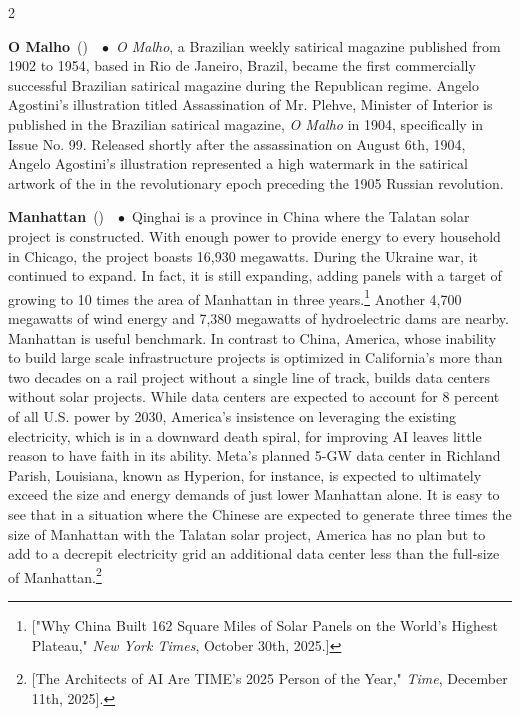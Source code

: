 \documentclass[10pt,a4paper,twoside]{article} %
\newcommand{\entry}[4]{\markboth{#1}{#1}\textbf{#1}\ {(#2)}\ \textit{#3}\ $\bullet$\ {#4}}  %
\begin{document}
\begin{multicols}{2}
{\entry{O Malho} {} {} {\emph{O Malho}, a Brazilian weekly satirical magazine published from 1902 to 1954, based in Rio de Janeiro, Brazil, became the first commercially successful Brazilian satirical magazine during the Republican regime. 
\newline \indent Angelo Agostini's illustration titled Assassination of Mr. Plehve, Minister of Interior is published in the Brazilian satirical magazine, \emph{O Malho} in 1904, specifically in Issue No. 99. Released shortly after the assassination on August 6th, 1904, Angelo Agostini's illustration represented a high watermark in the satirical artwork of the in the revolutionary epoch preceding the 1905 Russian revolution. 
}

\entry{Manhattan} {} {} {Qinghai is a province in China where the Talatan solar project is constructed. With enough power to provide energy to every household in Chicago, the project boasts 16,930 megawatts. During the Ukraine war, it continued to expand. In fact, it is still expanding, adding panels with a target of growing to 10 times the area of Manhattan in three years.\footnote{["Why China Built 162 Square Miles of Solar Panels on the World’s Highest Plateau," \emph{New York Times}, October 30th, 2025.]} Another 4,700 megawatts of wind energy and 7,380 megawatts of hydroelectric dams are nearby. Manhattan is useful benchmark. In contrast to China, America, whose inability to build large scale infrastructure projects is optimized in California's more than two decades on a rail project without a single line of track, builds data centers without solar projects. While data centers are expected to account for 8 percent of all U.S. power by 2030, America's insistence on leveraging the existing electricity, which is in a downward death spiral, for improving AI leaves little reason to have faith in its ability. Meta's planned 5-GW data center in Richland Parish, Louisiana, known as Hyperion, for instance, is expected to ultimately exceed the size and energy demands of just lower Manhattan alone. It is easy to see that in a situation where the Chinese are expected to generate three times the size of Manhattan with the Talatan solar project, America has no plan but to add to a decrepit electricity grid an additional data center less than the full-size of Manhattan.\footnote{[The Architects of AI Are TIME’s 2025 Person of the Year," \emph{Time}, December 11th, 2025].}}

}
\end{multicols}
\end{document}
